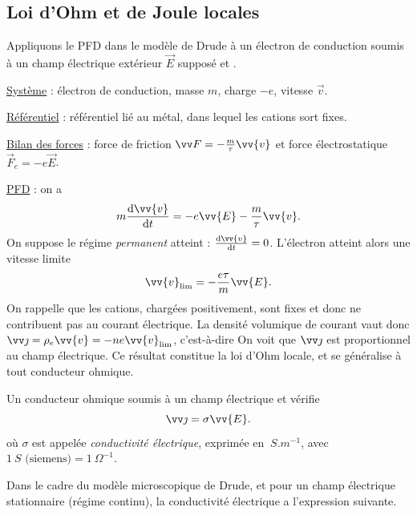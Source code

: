 \documentclass[12pt,fancy]{cours}%
\begin{document}
\subsection{Loi d'Ohm et de Joule locales}
 Appliquons le PFD dans le modèle de Drude  à un électron de conduction  soumis à un champ électrique extérieur $\Vec{E}$ supposé  et .


 \underline{Système} : électron de conduction, masse $m$, charge $-e$, vitesse $\Vec{v}$.

 \underline{Référentiel} : référentiel lié au métal,  dans lequel les cations sort fixes.

 \underline{Bilan des forces} : force de friction  $\Vec{F} = -\frac{m}{\tau}\vv{v} $ et force électrostatique $\Vec{F}_e = -e\Vec{E}$.

 \underline{PFD} : on a
 \begin{equation}
 \label{eq:PFD_drude}
 m\frac{\d\vv{v}}{\d t}=-e\vv{E}-\frac{m}{\tau}\vv{v}.
 \end{equation}
On suppose le régime \emph{permanent} atteint : $\frac{\d \vv{v}}{\d t}=0$. L'électron atteint alors une vitesse limite
\begin{equation}
\vv{v}_{\rm{lim}}=-\frac{e\tau}{m}\vv{E}.
\end{equation}
On rappelle que les cations, chargées positivement, sont fixes et donc ne contribuent pas au courant électrique. La densité volumique de courant vaut donc $\j=\rho_e\vv{v} =-ne \vv{v}_{\rm lim}$, c'est-à-dire
On voit que $\j$ est proportionnel au champ électrique. Ce résultat constitue la loi d'Ohm locale, et se généralise à tout conducteur ohmique.
\begin{theorem}\label{form:}
Un conducteur ohmique soumis à un champ électrique  et  vérifie
$$
\j= \sigma\vv{E}.
$$
où $\sigma$ est appelée \emph{conductivité électrique}, exprimée en $\SI{}{S.m^{-1}}$, avec $\SI{1}{S} \text{ (siemens)} = \SI{1}{\Omega^{-1}}$.
\end{theorem}
\noindent
 Dans le cadre du modèle microscopique de Drude, et pour un champ électrique stationnaire (régime continu), la conductivité électrique a l'expression suivante.
\end{document}
